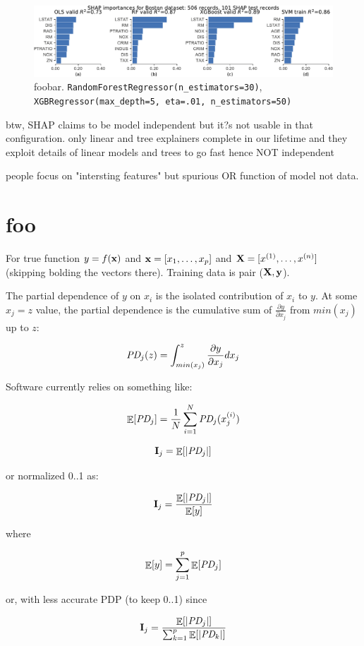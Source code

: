\documentclass[12pt]{article}
\newcommand{\Ex}{\mathop{\mathbb{E}}}
\newcommand{\Imp}{\mathbf{I}}
\begin{document}
\begin{figure}[htbp]
\begin{center}
\includegraphics[scale=0.54]{images/diff-models.pdf}
\caption{foobar. \texttt{\footnotesize RandomForestRegressor(n\_estimators=30)}, \texttt{\footnotesize XGBRegressor(max\_depth=5, eta=.01, n\_estimators=50)} }
\label{fig:diff-models}
\end{center}
\end{figure}

btw, SHAP claims to be model independent but it?s not usable in that configuration.  only linear and tree explainers complete in our lifetime and they exploit details of linear models and trees to go fast hence NOT independent

people focus on "intersting features" but spurious OR function of model not data.

\section{foo}

For true function $y = f(\bf x)$ and ${\bf x} = [x_1, \ldots, x_p]$ and ${\bf X} = [x^{(1)}, \ldots, x^{(n)}]$ (skipping bolding the vectors there).  Training data is pair ($\bf X, y$).

The partial dependence of $y$ on  $x_i$ is the isolated contribution of $x_i$ to $y$. At some $x_j=z$ value, the partial dependence is the cumulative sum of $\frac{\partial y}{\partial x_j}$ from $min(x_j)$ up to $z$:

\[
\text{\it PD}_j(z) = \int_{min(x_j)}^z \frac{\partial y}{\partial x_j} dx_j
\]

Software currently relies on something like:

\[
\Ex[\text{\it PD}_j] = \frac{1}{N} \sum_{i=1}^{N} \text{\it PD}_j(x_j^{(i)})
 \]

\[
\Imp_j = \Ex[|\text{\it PD}_j|]
\]

or normalized 0..1 as:

\[
\Imp_j = \frac{\Ex[|\text{\it PD}_j|]}{\Ex[y]}
\]

\noindent where

\[
\Ex[y] = \sum_{j=1}^p \Ex[\text{\it PD}_j]%
\]

or, with less accurate PDP (to keep 0..1) since

\[
\Imp_j = \frac{\Ex[|\text{\it PD}_j|]}{\sum_{k=1}^p \Ex[|\text{\it PD}_k|]}
\]




\end{document}
